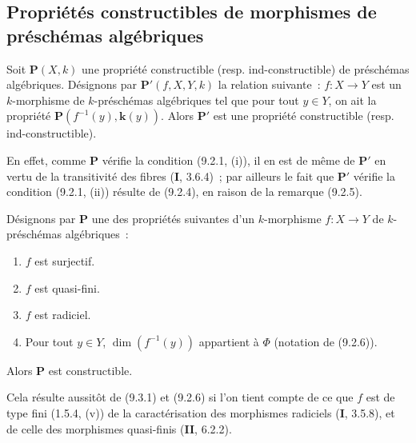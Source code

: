\subsection{Propriétés constructibles de morphismes de préschémas algébriques}

\begin{proposition}[9.3.1]
\label{IV.9.3.1-fr}
Soit $\boldsymbol{P}(X,k)$ une propriété constructible \textup{(resp.} ind-constructible\textup{)}
de préschémas algébriques. Désignons par $\boldsymbol{P}'(f,X,Y,k)$ la relation
suivante~: $f:X\to Y$ est un $k$-morphisme de $k$-préschémas algébriques tel
que pour tout $y\in Y$, on ait la propriété
$\boldsymbol{P}(f^{-1}(y),\boldsymbol{k}(y))$. Alors $\boldsymbol{P}'$ est une propriété
constructible \textup{(resp.} ind-constructible\textup{)}.
\end{proposition}

En effet, comme $\boldsymbol{P}$ vérifie la condition (9.2.1, (i)), il en est de
même de $\boldsymbol{P}'$ en vertu de la transitivité des fibres (\textbf{I}, 3.6.4)~; par
ailleurs le fait que $\boldsymbol{P}'$ vérifie la condition (9.2.1, (ii)) résulte
de (9.2.4), en raison de la remarque (9.2.5).

\begin{proposition}[9.3.2]
\label{IV.9.3.2-fr}
Désignons par $\boldsymbol{P}$ une des propriétés suivantes d'un $k$-morphisme
$f:X\to Y$ de $k$-préschémas algébriques~:
\begin{enumerate}[label=\textup{(\roman*)}]
  \item $f$ est surjectif.
  \item $f$ est quasi-fini.
  \item $f$ est radiciel.
  \item Pour tout $y\in Y$, $\dim(f^{-1}(y))$ appartient à $\Phi$ (notation
  de \textup{(9.2.6)}).
\end{enumerate}
Alors $\boldsymbol{P}$ est constructible.
\end{proposition}

Cela résulte aussitôt de (9.3.1) et (9.2.6) si l'on tient compte de ce que $f$
est de type fini (1.5.4, (v)) de la caractérisation des morphismes radiciels
(\textbf{I}, 3.5.8), et de celle des morphismes quasi-finis (\textbf{II}, 6.2.2).

